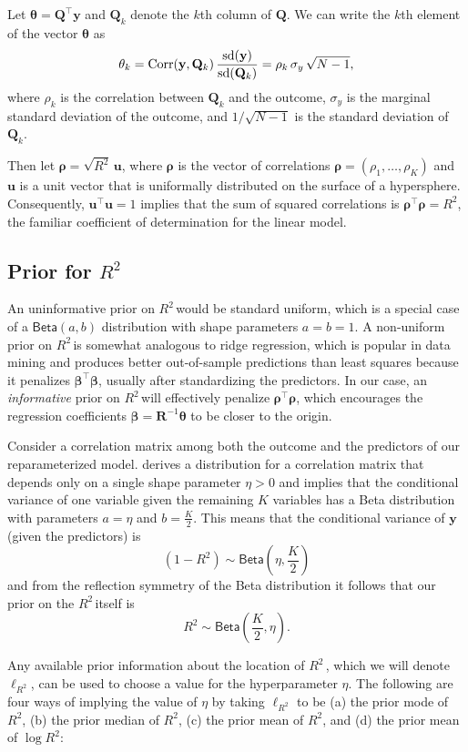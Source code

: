 \documentclass[11pt]{article}
\newcommand{\Rsq}{$R^2\,$}
\newcommand{\boldrho}{\boldsymbol{\rho}}
\newcommand{\boldbeta}{\boldsymbol{\beta}}
\newcommand{\boldtheta}{\boldsymbol{\theta}}
\newcommand{\y}{\mathbf{y}}
\newcommand{\Q}{\mathbf{Q}}
\newcommand{\R}{\mathbf{R}}
\renewcommand{\u}{\mathbf{u}}
\newcommand{\locRsq}{\ell_{R^2}}
\newcommand{\halfK}{\frac{K}{2}}
\newcommand{\Betadist}[2]{\mathsf{Beta}\left(#1,#2\right)}
\begin{document}
Let $\boldtheta = \Q^\top \y$ and $\Q_k$ denote the $k$th column of $\Q$. We can
write the $k$th element of the vector $\boldtheta$ as
$$\theta_k
  = {\rm Corr}(\y, \Q_k) \, \frac{{\rm sd}(\y)}{{\rm sd}(\Q_k)}
  = \rho_k \, \sigma_y \, \sqrt{N - 1},
$$
where $\rho_k$ is the correlation between $\Q_k$ and the outcome, $\sigma_y$ is
the marginal standard deviation of the outcome, and $1/\sqrt{N-1}$ is the
standard deviation of $\Q_k$.

Then let $\boldrho = \sqrt{R^2} \, \u$, where $\boldrho$ is the vector of
correlations $\boldrho = (\rho_1, \dots, \rho_K)$ and $\u$ is a unit vector that is
uniformally distributed on the surface of a hypersphere. Consequently, $\u^\top
\u = 1$ implies that the sum of squared correlations is $\boldrho^\top \boldrho =
R^2$, the familiar coefficient of determination for the linear model.

\subsection{Prior for \Rsq}
\label{subsec:r2prior}

An uninformative prior on \Rsq would be standard uniform, which is a special
case of a $\Betadist{a}{b}$ distribution with shape parameters $a = b = 1$.
A non-uniform prior on \Rsq is somewhat analogous to ridge
regression, which is popular in data mining and produces better out-of-sample
predictions than least squares because it penalizes $\boldbeta^\top \boldbeta$,
usually after standardizing the predictors. In our case, an \emph{informative}
prior on \Rsq will effectively penalize $\boldrho^\top \boldrho$, which
encourages the regression coefficients $\boldbeta = \R^{-1} \boldtheta$
to be closer to the origin.

Consider a correlation matrix among both the outcome and the predictors of our
reparameterized model.  derives a distribution for a correlation
matrix that depends only on a single shape parameter $\eta > 0$ and implies that
the conditional variance of one variable given the remaining $K$ variables has a
Beta distribution with parameters $a = \eta$ and $b = \halfK$. This means that
the conditional variance of $\y$ (given the predictors) is
%
$$(1 - R^2) \sim \Betadist{\eta}{\halfK}$$
%
and from the reflection symmetry of the Beta distribution it follows that our
prior on the \Rsq itself is
%
$$R^2 \sim \Betadist{\halfK}{\eta}.$$

Any available prior information about the location of \Rsq, which we will denote
$\locRsq$, can be used to choose a value for the hyperparameter $\eta$. The
following are four ways of implying the value of $\eta$ by taking $\locRsq$ to
be (a) the prior mode of $R^2$, (b) the prior median of $R^2$, (c) the prior
mean of $R^2$, and (d) the prior mean of $\log{R^2}$:
\end{document}
